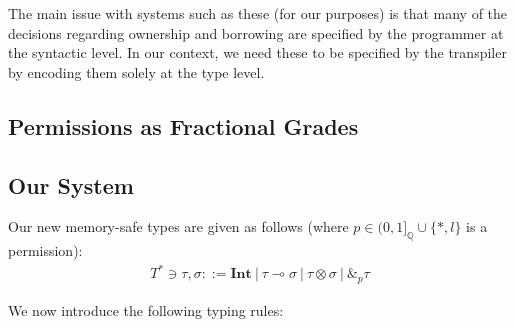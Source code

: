 \documentclass{article}
\renewcommand\em{\bfseries}
\begin{document}

The main issue with systems such as these (for our purposes) is that many of the decisions regarding ownership and borrowing are specified by the programmer at the syntactic level. In our context, we need these to be specified by the transpiler by encoding them solely at the type level. 



\subsection{Permissions as Fractional Grades}

\subsection{Our System}

Our new memory-safe types are given as follows (where $p \in (0, 1]_{\mathbb{Q}} \cup \{*, l\}$ is a permission):
\begin{align*}
    T^* \ni \tau, \sigma ::=  \textbf{Int} ~|~ \tau \multimap \sigma ~|~ \tau \otimes \sigma ~|~ \&_p \tau
\end{align*}

We now introduce the following typing rules:


\renewcommand\em{\it}
\printbibliography[title={References}]
\end{document}
